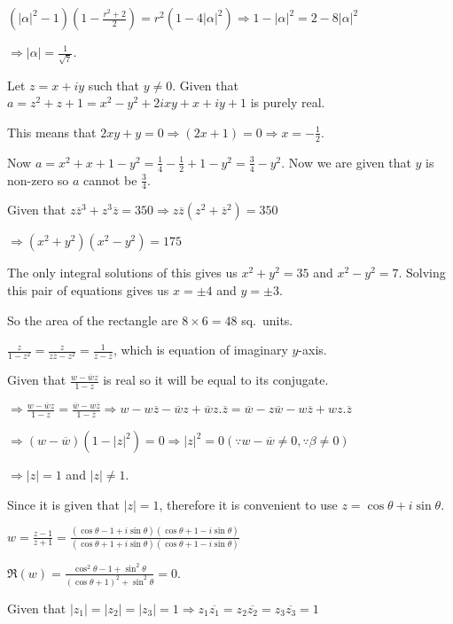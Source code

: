   $(|\alpha|^2 - 1)(1 - \frac{r^2 + 2}{2}) = r^2(1 - 4|\alpha|^2)\Rightarrow 1 - |\alpha|^2 = 2 - 8|\alpha|^2$

  $\Rightarrow |\alpha| = \frac{1}{\sqrt{7}}$.
\item Let $z = x + iy$ such that $y\neq 0$. Given that $a = z^2 + z + 1 = x^2 - y^2 + 2ixy + x + iy + 1$ is
  purely real.

  This means that $2xy + y = 0 \Rightarrow (2x + 1) = 0\Rightarrow x = -\frac{1}{2}$.

  Now $a = x^2 + x + 1 - y^2 = \frac{1}{4} - \frac{1}{2} + 1 - y^2 = \frac{3}{4} - y^2$. Now we are given
  that $y$ is non-zero so $a$ cannot be $\frac{3}{4}$.
\item Given that $z\overline{z}^3 + z^3\overline{z} = 350\Rightarrow z\overline{z}(z^2 + \overline{z}^2) =
  350$

  $\Rightarrow (x^2 + y^2)(x^2 - y^2) = 175$

  The only integral solutions of this gives us $x^2 + y^2 = 35$ and $x^2 - y^2 = 7$. Solving this pair of
  equations gives us $x = \pm4$ and $y = \pm3$.

  So the area of the rectangle are $8\times 6 = 48$ sq.\ units.
\item $\frac{z}{1 - z^2} = \frac{z}{z\overline{z} - z^2} = \frac{1}{z - \overline{z}}$, which is equation of
  imaginary $y$-axis.
\item Given that $\frac{w - \overline{w}z}{1 - z}$ is real so it will be equal to its conjugate.

  $\Rightarrow \frac{w - \overline{w}z}{1 - z} = \frac{\overline{w} - w\overline{z}}{1 -
  \overline{z}}\Rightarrow w - w\overline{z} - \overline{w}z + \overline{w}z.\overline{z} = \overline{w} -
  z\overline{w} - w\overline{z} + wz.\overline{z}$

  $\Rightarrow (w - \overline{w})(1 - |z|^2) = 0\Rightarrow |z|^2 = 0(\because w - \overline{w}\neq 0,
  \because \beta\neq 0)$

  $\Rightarrow |z| = 1$ and $|z|\neq 1$.
\item Since it is given that $|z| = 1$, therefore it is convenient to use $z = \cos\theta + i\sin\theta$.

  $w = \frac{z - 1}{z + 1} = \frac{(\cos\theta - 1 + i\sin\theta)(\cos\theta + 1 - i\sin\theta)}{(\cos\theta
  + 1 + i\sin\theta)(\cos\theta + 1 - i\sin\theta)}$

  $\Re(w) = \frac{\cos^2\theta - 1 + \sin^2\theta }{(\cos\theta + 1)^2 + \sin^2\theta} = 0$.
\item Given that $|z_1| = |z_2| = |z_3| = 1 \Rightarrow z_1\overline{z_1} = z_2\overline{z_2} =
  z_3\overline{z_3} = 1$

